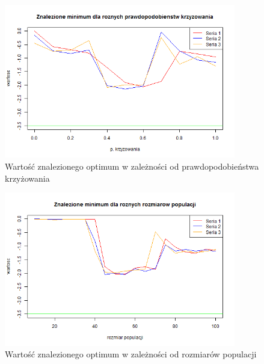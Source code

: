 \documentclass[11pt, a4paper]{article}
\begin{document}
\begin{figure}[H]
	\begin{center}
		\includegraphics[width=0.9\textwidth]{./assets/Zeldasine203.png}
		\caption{Wartość znalezionego optimum w zależności od prawdopodobieństwa krzyżowania}
		\label{fig:zeldasine3}
	\end{center}
\end{figure}

\begin{figure}[H]
	\begin{center}
		\includegraphics[width=0.9\textwidth]{./assets/Zeldasine204.png}
		\caption{Wartość znalezionego optimum w zależności od rozmiarów populacji}
		\label{fig:zeldasine4}
	\end{center}
\end{figure}
\end{document}
